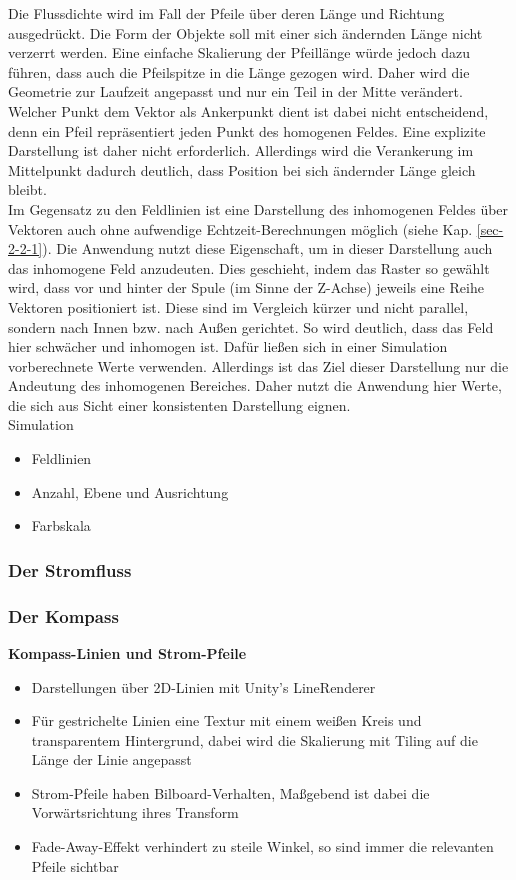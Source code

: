 Die Flussdichte wird im Fall der Pfeile über deren Länge und Richtung ausgedrückt. Die Form der Objekte soll mit einer sich ändernden Länge nicht verzerrt werden. Eine einfache Skalierung der Pfeillänge würde jedoch dazu führen, dass auch die Pfeilspitze in die Länge gezogen wird. Daher wird die Geometrie zur Laufzeit angepasst und nur ein Teil in der Mitte verändert.\\

Welcher Punkt dem Vektor als Ankerpunkt dient ist dabei nicht entscheidend, denn ein Pfeil repräsentiert jeden Punkt des homogenen Feldes. Eine explizite Darstellung ist daher nicht erforderlich. Allerdings wird die Verankerung im Mittelpunkt dadurch deutlich, dass Position bei sich ändernder Länge gleich bleibt.\\

Im Gegensatz zu den Feldlinien ist eine Darstellung des inhomogenen Feldes über Vektoren auch ohne aufwendige Echtzeit-Berechnungen möglich (siehe Kap. \ref{sec-2-2-1}). Die Anwendung nutzt diese Eigenschaft, um in dieser Darstellung auch das inhomogene Feld anzudeuten. Dies geschieht, indem das Raster so gewählt wird, dass vor und hinter der Spule (im Sinne der Z-Achse) jeweils eine Reihe Vektoren positioniert ist. Diese sind im Vergleich kürzer und nicht parallel, sondern nach Innen bzw. nach Außen gerichtet. So wird deutlich, dass das Feld hier schwächer und inhomogen ist. Dafür ließen sich in einer Simulation vorberechnete Werte verwenden. Allerdings ist das Ziel dieser Darstellung nur die Andeutung des inhomogenen Bereiches. Daher nutzt die Anwendung hier Werte, die sich aus Sicht einer konsistenten Darstellung eignen.\\
 
Simulation
\begin{itemize}
	\item Feldlinien
	\item Anzahl, Ebene und Ausrichtung
	\item Farbskala
\end{itemize}

\subsubsection{Der Stromfluss}

\subsubsection{Der Kompass}
\textbf{Kompass-Linien und Strom-Pfeile}
\begin{itemize}
	\item Darstellungen über 2D-Linien mit Unity's LineRenderer
	\item Für gestrichelte Linien eine Textur mit einem weißen Kreis und transparentem Hintergrund, dabei wird die Skalierung mit Tiling auf die Länge der Linie angepasst
	\item Strom-Pfeile haben Bilboard-Verhalten, Maßgebend ist dabei die Vorwärtsrichtung ihres Transform
	\item Fade-Away-Effekt verhindert zu steile Winkel, so sind immer die relevanten Pfeile sichtbar
\end{itemize}

